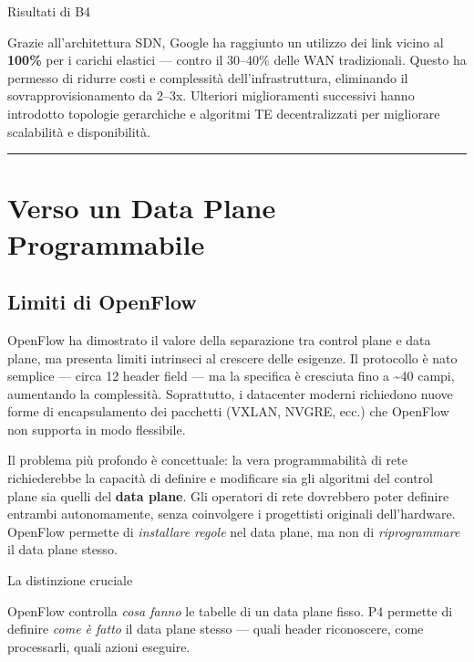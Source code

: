 \documentclass[
  italian,
  openany]{book}
\begin{document}
\begin{calloutnote}{Risultati di B4}

Grazie all'architettura SDN, Google ha raggiunto un utilizzo dei link
vicino al \textbf{100\%} per i carichi elastici --- contro il 30--40\%
delle WAN tradizionali. Questo ha permesso di ridurre costi e
complessità dell'infrastruttura, eliminando il sovrapprovisionamento da
2--3x. Ulteriori miglioramenti successivi hanno introdotto topologie
gerarchiche e algoritmi TE decentralizzati per migliorare scalabilità e
disponibilità.

\end{calloutnote}

\begin{center}\rule{0.5\linewidth}{0.5pt}\end{center}

\section{Verso un Data Plane
Programmabile}\label{verso-un-data-plane-programmabile}

\subsection{Limiti di OpenFlow}\label{limiti-di-openflow}

OpenFlow ha dimostrato il valore della separazione tra control plane e
data plane, ma presenta limiti intrinseci al crescere delle esigenze. Il
protocollo è nato semplice --- circa 12 header field --- ma la specifica
è cresciuta fino a \textasciitilde40 campi, aumentando la complessità.
Soprattutto, i datacenter moderni richiedono nuove forme di
encapsulamento dei pacchetti (VXLAN, NVGRE, ecc.) che OpenFlow non
supporta in modo flessibile.

Il problema più profondo è concettuale: la vera programmabilità di rete
richiederebbe la capacità di definire e modificare sia gli algoritmi del
control plane sia quelli del \textbf{data plane}. Gli operatori di rete
dovrebbero poter definire entrambi autonomamente, senza coinvolgere i
progettisti originali dell'hardware. OpenFlow permette di
\emph{installare regole} nel data plane, ma non di \emph{riprogrammare}
il data plane stesso.

\begin{callouttip}{La distinzione cruciale}

OpenFlow controlla \emph{cosa fanno} le tabelle di un data plane fisso.
P4 permette di definire \emph{come è fatto} il data plane stesso ---
quali header riconoscere, come processarli, quali azioni eseguire.

\end{callouttip}
\end{document}

